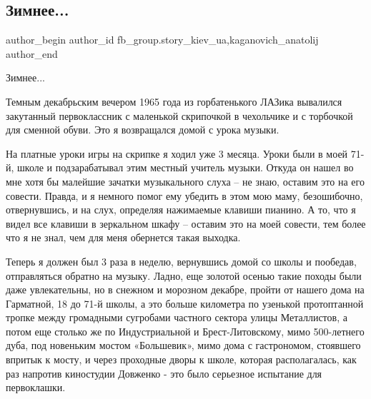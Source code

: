  
 
 
 
 
 
\subsection{Зимнее...}
\label{sec:30_12_2021.fb.fb_group.story_kiev_ua.3.zimnee_a}
 
\ifcmt
 author_begin
   author_id fb_group.story_kiev_ua,kaganovich_anatolij
 author_end
\fi

Зимнее...


Темным декабрьским вечером 1965 года из горбатенького ЛАЗика вывалился
закутанный первоклассник с маленькой скрипочкой в чехольчике и с торбочкой для
сменной обуви. Это я возвращался домой с урока музыки.

На платные уроки игры на скрипке я ходил уже 3 месяца. Уроки были в моей 71-й,
школе и подзарабатывал этим местный учитель музыки. Откуда он нашел во мне хотя
бы малейшие зачатки музыкального слуха – не знаю, оставим это на его совести.
Правда, и я немного помог ему убедить в этом мою маму, безошибочно,
отвернувшись, и на слух, определяя нажимаемые клавиши пианино. А то, что я
видел все клавиши в зеркальном шкафу – оставим это на моей совести, тем более
что я не знал, чем для меня обернется такая выходка.

Теперь я должен был 3 раза в неделю, вернувшись домой со школы и пообедав,
отправляться обратно на музыку. Ладно, еще золотой осенью такие походы были
даже увлекательны, но в снежном и морозном декабре, пройти от нашего дома на
Гарматной, 18 до 71-й школы, а это больше километра по узенькой протоптанной
тропке между громадными сугробами частного сектора улицы Металлистов, а потом
еще столько же по Индустриальной и Брест-Литовскому, мимо 500-летнего дуба, под
новеньким мостом «Большевик», мимо дома с гастрономом, стоявшего впритык к
мосту, и через проходные дворы к школе, которая располагалась, как раз напротив
киностудии Довженко - это было серьезное испытание для первоклашки.

